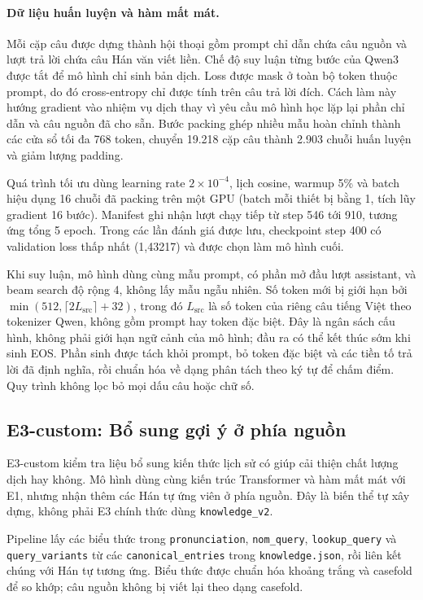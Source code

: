 \documentclass[11pt,twocolumn]{article}
\begin{document}
\paragraph{Dữ liệu huấn luyện và hàm mất mát.}
Mỗi cặp câu được dựng thành hội thoại gồm prompt chỉ dẫn chứa câu nguồn và lượt
trả lời chứa câu Hán văn viết liền. Chế độ suy luận từng bước của Qwen3 được
tắt để mô hình chỉ sinh bản dịch. Loss được mask ở toàn bộ token thuộc prompt,
do đó cross-entropy chỉ được tính trên câu trả lời đích. Cách làm này hướng
gradient vào nhiệm vụ dịch thay vì yêu cầu mô hình học lặp lại phần chỉ dẫn và
câu nguồn đã cho sẵn. Bước packing ghép nhiều mẫu hoàn chỉnh thành các cửa sổ
tối đa 768 token, chuyển 19.218 cặp câu thành 2.903 chuỗi huấn luyện và giảm
lượng padding.

Quá trình tối ưu dùng learning rate $2\times10^{-4}$, lịch cosine,
warmup 5\% và batch hiệu dụng 16 chuỗi đã packing trên một GPU
(batch mỗi thiết bị bằng 1, tích lũy gradient 16 bước).
Manifest ghi nhận lượt chạy tiếp từ step 546 tới 910, tương ứng tổng 5 epoch.
Trong các lần đánh giá được lưu, checkpoint step 400 có validation loss
thấp nhất (1,43217) và được chọn làm mô hình cuối.

Khi suy luận, mô hình dùng cùng mẫu prompt, có phần mở đầu lượt assistant,
và beam search độ rộng 4, không lấy mẫu ngẫu nhiên. Số token mới bị giới hạn bởi
$\min(512,\lceil 2L_{\mathrm{src}}\rceil+32)$, trong đó $L_{\mathrm{src}}$
là số token của riêng câu tiếng Việt theo tokenizer Qwen, không gồm prompt
hay token đặc biệt. Đây là ngân sách cấu hình, không phải giới hạn ngữ cảnh
của mô hình; đầu ra có thể kết thúc sớm khi sinh EOS.
Phần sinh được tách khỏi prompt, bỏ token đặc biệt và các tiền tố trả lời
đã định nghĩa, rồi chuẩn hóa về dạng phân tách theo ký tự để chấm điểm.
Quy trình không lọc bỏ mọi dấu câu hoặc chữ số.

\subsection{E3-custom: Bổ sung gợi ý ở phía nguồn}

E3-custom kiểm tra liệu bổ sung kiến thức lịch sử có giúp cải thiện chất lượng
dịch hay không. Mô hình dùng cùng kiến trúc Transformer và hàm mất mát với E1,
nhưng nhận thêm các Hán tự ứng viên ở phía nguồn. Đây là biến thể tự xây dựng,
không phải E3 chính thức dùng \texttt{knowledge\_v2}.

Pipeline lấy các biểu thức trong \texttt{pronunciation}, \texttt{nom\_query},
\texttt{lookup\_query} và \texttt{query\_variants} từ các
\texttt{canonical\_entries} trong \texttt{knowledge.json}, rồi liên kết
chúng với Hán tự tương ứng. Biểu thức được chuẩn hóa khoảng trắng và casefold
để so khớp; câu nguồn không bị viết lại theo dạng casefold.
\end{document}
